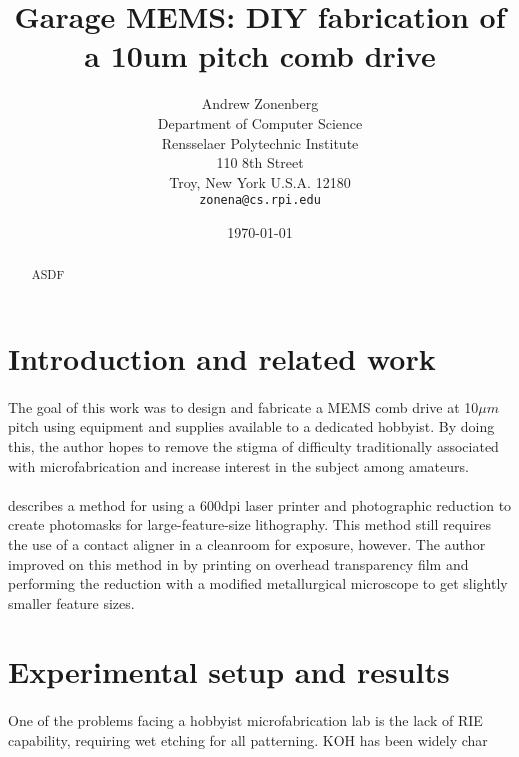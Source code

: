 \documentclass[twocolumn]{article}
\begin{document}
\title{Garage MEMS: DIY fabrication of a 10um pitch comb drive}
\author{Andrew Zonenberg\\
	Department of Computer Science\\
	Rensselaer Polytechnic Institute\\
	110 8th Street\\
	Troy, New York U.S.A. 12180\\
	\texttt{zonena@cs.rpi.edu}}
\date{\today}
\maketitle

\begin{abstract}
\paragraph*{}
ASDF
\end{abstract}

\section{Introduction and related work}
\paragraph*{}
The goal of this work was to design and fabricate a MEMS comb drive at 10$\mu m$ pitch using
equipment and supplies available to a dedicated hobbyist. By doing this, the author hopes to remove
the stigma of difficulty traditionally associated with microfabrication and increase interest in the
subject among amateurs.

\paragraph*{}
\cite{OfficePrint} describes a method for using a 600dpi laser printer and photographic reduction to
create photomasks for large-feature-size lithography. This method still requires the use of a
contact aligner in a cleanroom for exposure, however. The author improved on this method in
\cite{DiyFab} by printing on overhead transparency film and performing the reduction with a
modified metallurgical microscope to get slightly smaller feature sizes.

\section{Experimental setup and results}
\paragraph*{}
One of the problems facing a hobbyist microfabrication lab is the lack of RIE capability, requiring
wet etching for all patterning. KOH has been widely char
\end{document}
